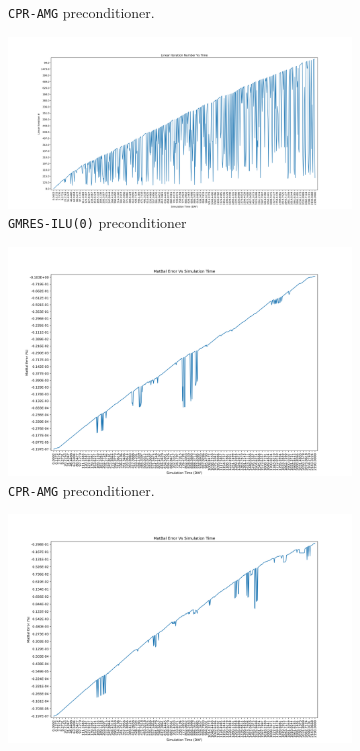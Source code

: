\begin{figure}
\begin{subfigure}{.5\textwidth}
  \caption{\texttt{CPR-AMG} preconditioner.}
	\label{case2_its_cpr}
\end{subfigure}%
\begin{subfigure}{.5\textwidth}
  \centering
  \includegraphics[width=1.1\linewidth]{figures/case2/ilu/its_time.png_reduced.png}
  \caption{\texttt{GMRES-ILU(0)} preconditioner}
	\label{case2_its_ilu}
\end{subfigure}
\begin{subfigure}{.5\textwidth}
  \centering
  \includegraphics[width=1.1\linewidth]{figures/case2/cpr/matbalerr_time.png_reduced.png}
  \caption{\texttt{CPR-AMG} preconditioner.}
	\label{case2_matbalerr_cpr}
\end{subfigure}%
\begin{subfigure}{.5\textwidth}
  \centering
  \includegraphics[width=1.1\linewidth]{figures/case2/ilu/matbalerr_time.png_reduced.png}

\end{subfigure}
\end{figure}

